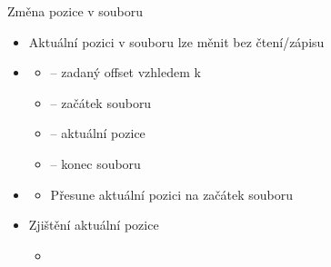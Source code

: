 \begin{frame}{Změna pozice v souboru}

  \begin{itemize}
    \item Aktuální pozici v souboru lze měnit bez čtení/zápisu
    \item {}
    \begin{itemize}
      \item {} -- zadaný offset vzhledem k 
      \item {} -- začátek souboru
      \item {} -- aktuální pozice
      \item {} -- konec souboru
    \end{itemize}

    \pause

    \item {}
    \begin{itemize}
      \item Přesune aktuální pozici na začátek souboru
    \end{itemize}

    \pause

    \item Zjištění aktuální pozice
    \begin{itemize}
      \item {}
    \end{itemize}

  \end{itemize}

\end{frame}

